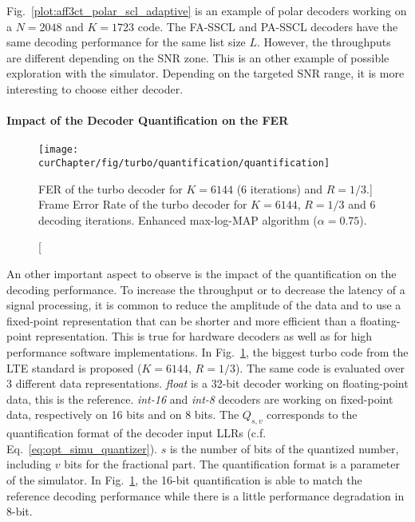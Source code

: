 Fig.~\ref{plot:aff3ct_polar_scl_adaptive} is an example of polar decoders
working on a $N = 2048$ and $K = 1723$ code. The FA-SSCL and PA-SSCL decoders
have the same decoding performance for the same list size $L$. However, the
throughputs are different depending on the SNR zone. This is an other example of
possible exploration with the \AFFECT simulator. Depending on the targeted SNR
range, it is more interesting to choose either decoder.

\paragraph{Impact of the Decoder Quantification on the FER}

\begin{figure}[htp]
  \centering
  \texttt{[image: \\curChapter/fig/turbo/quantification/quantification]}
  \caption
    [FER of the turbo decoder for $K = 6144$ (6 iterations) and
     $R=1/3$.]
    {Frame Error Rate of the turbo decoder for $K = 6144$, $R=1/3$ and 6
     decoding iterations. Enhanced max-log-MAP algorithm ($\alpha = 0.75$).}
  \label{plot:aff3ct_turbo_quantification}
\end{figure}

An other important aspect to observe is the impact of the quantification on the
decoding performance. To increase the throughput or to decrease the latency of
a signal processing, it is common to reduce the amplitude of the data and to
use a fixed-point representation that can be shorter and more efficient than a
floating-point representation. This is true for hardware decoders as well as for
high performance software implementations. In
Fig.~\ref{plot:aff3ct_turbo_quantification}, the biggest turbo code from the LTE
standard is proposed ($K = 6144$, $R = 1/3$). The same code is evaluated over 3
different data representations. \emph{float} is a 32-bit decoder working on
floating-point data, this is the reference. \emph{int-16} and \emph{int-8}
decoders are working on fixed-point data, respectively on 16 bits and on 8 bits.
The $Q_{s,v}$ corresponds to the quantification format of the decoder input LLRs
(c.f. Eq.~\ref{eq:opt_simu_quantizer}). $s$ is the number of bits of the
quantized number, including $v$ bits for the fractional part. The quantification
format is a parameter of the \AFFECT simulator. In
Fig.~\ref{plot:aff3ct_turbo_quantification}, the 16-bit quantification is able
to match the reference decoding performance while there is a little performance
degradation in 8-bit.

